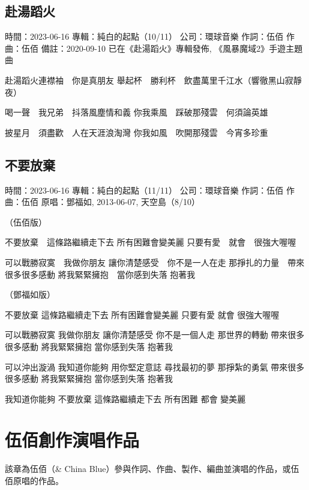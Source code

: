 \documentclass[UTF8,a4paper,oneside,twocolumn,12pt]{ctexbook}
\newcommand{\infopair}[2]{\textbullet #1：#2}
\newcommand{\zc}[1][伍佰]{\infopair{作詞}{#1}}
\newcommand{\zq}[1][伍佰]{\infopair{作曲}{#1}}
\newcommand{\zj}[1]{\infopair{專輯}{#1}}
\newcommand{\yc}[1]{\infopair{原唱}{#1}}
\newcommand{\sj}[1]{\infopair{時間}{#1}}
\newcommand{\bz}[1]{\infopair{備註}{#1}}
\newcommand{\gs}[1]{\infopair{公司}{#1}}
\newenvironment{info}{\begin{flushleft}\kaishu
	}
	{\end{flushleft}\normalsize\yahei\par}
\newenvironment{lyric}{
	}
{}
\begin{document}
\section{赴湯蹈火}
\begin{info}
	\sj{2023-06-16}
	\zj{純白的起點（10/11）}
	\gs{環球音樂}
	\zc
	\zq
	\bz{2020-09-10 已在《赴湯蹈火》專輯發佈, 《風暴魔域2》手遊主題曲}
\end{info}
\begin{lyric}
	赴湯蹈火連襟袖　你是真朋友
	舉起杯　勝利杯　飲盡萬里千江水（響徹黑山寂靜夜）

	喝一聲　我兄弟　抖落風塵情和義
	你我乘風　踩破那殘雲　何須論英雄

	披星月　須盡歡　人在天涯浪淘灣
	你我如風　吹開那殘雲　今宵多珍重
\end{lyric}

\section{不要放棄}
\begin{info}
	\sj{2023-06-16}
	\zj{純白的起點（11/11）}
	\gs{環球音樂}
	\zc
	\zq
	\yc{鄧福如, 2013-06-07, 天空島（8/10）}
\end{info}
\begin{lyric}
	（伍佰版）

	不要放棄　這條路繼續走下去
	所有困難會變美麗
	只要有愛　就會　很強大喔喔

	可以戰勝寂寞　我做你朋友
	讓你清楚感受　你不是一人在走
	那掙扎的力量　帶來很多很多感動
	將我緊緊擁抱　當你感到失落
	抱著我

	（鄧福如版）

	不要放棄 這條路繼續走下去
	所有困難會變美麗
	只要有愛 就會 很強大喔喔

	可以戰勝寂寞 我做你朋友
	讓你清楚感受 你不是一個人走
	那世界的轉動 帶來很多很多感動
	將我緊緊擁抱 當你感到失落
	抱著我

	可以沖出漩渦 我知道你能夠
	用你堅定意誌 尋找最初的夢
	那掙紮的勇氣 帶來很多很多感動
	將我緊緊擁抱 當你感到失落
	抱著我

	我知道你能夠
	不要放棄 這條路繼續走下去
	所有困難 都會 變美麗
\end{lyric}

\chapter{伍佰創作演唱作品}
該章為伍佰（\& China Blue）參與作詞、作曲、製作、編曲並演唱的作品，或伍佰原唱的作品。
\end{document}
